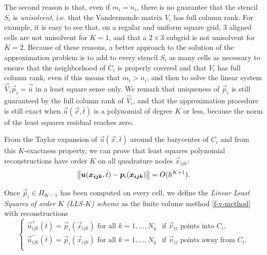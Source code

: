 The second reason is that, even if $m_{i}=n_{i}$, there is no guarantee
that the stencil $S_{i}$ is \emph{unisolvent}, i.e. that the Vandermonde
matrix $V_{i}$ has full column rank. For example, it is easy to see that,
on a regular and uniform square grid, $3$ aligned cells are not unisolvent
for $K=1$, and that a $2\times 3$ subgrid is not unisolvent for $K=2$. Because
of these reasons, a better approach to the solution of the approximation
problem is to add to every stencil $S_{i}$ as many cells as necessary to
ensure that the neighborhood of $C_{i}$ is properly covered and that $V_{i}$
has full column rank, even if this means that $m_{i}>n_{i}$, and then to
solve the linear system $\vec{V}_{i}\vec{p}_{i}=\vec{\bar{u}}$ in a least square
sense only. We remark that uniqueness of $\vec{p}_{i}$ is still guaranteed
by the full column rank of $\vec{V}_{i}$, and that the approximation procedure
is still exact when $\vec{u}(\vec{x},\bar{t})$ is a polynomial of degree $K$ or less,
because the norm of the least squares residual reaches zero.

From the Taylor expansion of $\vec{u}(\vec{x},\bar{t})$ around the barycenter
of $C_{i}$ and from this $K$-exactness property, we can prove that least
squares polynomial reconstructions have order $K$ on all quadrature nodes
$\vec{x}_{ijk}$:
\[
\left\lVert \bm{u}(\bm{x_{ijk}},\bar{t})-\bm{p}_{i}(\bm{x_{ijk}}) \right\rVert
= O(h^{K+1}).
\]

\begin{defi}
Once $\vec{p}_i \in \Pi_{K-1}$ has been computed on every cell, we define
the \emph{Linear Least Squares of order $K$ (LLS-$K$) scheme} as the finite
volume method \eqref{f-v-method} with reconstructions
\begin{equation*}
\begin{cases}
\vec{u}^{+}_{ijk}(\bar{t}) = \vec{p}_{i}(\vec{x}_{ijk}) \text{ for all }k=1,\dots,N_{q}
	&\text{if }\vec{\nu}_{ij} \text{ points into } C_i, \\
\vec{u}^{-}_{ijk}(\bar{t}) = \vec{p}_{i}(\vec{x}_{ijk}) \text{ for all }k=1,\dots, N_{q}
	&\text{if }\vec{\nu}_{ij} \text{ points away from } C_{i}.\\
\end{cases}	
\end{equation*}
\end{defi}

